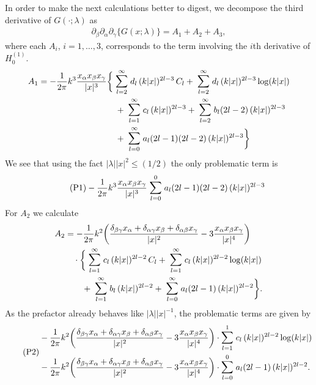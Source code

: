 In order to make the next calculations better to digest, we decompose the third derivative of $G(\cdot; \lambda)$ as 
\begin{align*}
  \partial_\beta \partial_\alpha \partial_\gamma \big\{G(x; \lambda)\big\}
  = A_1 + A_2 + A_3,
\end{align*}
where each $A_i$, $i = 1,\dots,3$, corresponds to the term involving the $i$th derivative of $H_0^{(1)}$.
\begin{align*}
  A_1 = - \frac{1}{2 \pi } k^3 \frac{x_\alpha x_\beta x_\gamma}{|x|^3} 
  &\bigg\{
     \; \mathlarger{\sum}_{l = 2}^\infty \; d_l \, (k|x|)^{2l - 3} \, C_l + \; \mathlarger{\sum}_{l = 2}^\infty \; d_l \, (k|x|)^{2l - 3} \log(k|x|)  \\
  &\quad  + \; \mathlarger{\sum}_{l = 1}^\infty \; c_l \, (k|x|)^{2l - 3} + \; \mathlarger{\sum}_{l = 2}^\infty \; b_l (2l - 2) \, (k|x|)^{2l - 3} \\
  &\quad + \; \mathlarger{\sum}_{l = 0}^\infty \; a_l (2l - 1) (2l - 2) \, (k|x|)^{2l - 3} 
  \bigg\}
\end{align*}
We see that using the fact $|\lambda| |x|^2 \leq (1/2)$ the only problematic term is
\begin{align}
  \label{eq:P1}
  \tag{P1}- \frac{1}{2 \pi } k^3 \frac{x_\alpha x_\beta x_\gamma}{|x|^3}  \; \mathlarger{\sum}_{l = 0}^{0} \; a_l (2l - 1) (2l - 2) \, (k|x|)^{2l - 3} 
\end{align}
For $A_2$ we calculate
\begin{align*}
  A_2 &= - \frac{1}{2\pi} k^2 \bigg(\frac{\delta_{\beta\gamma} x_\alpha + \delta_{\alpha \gamma} x_\beta + \delta_{\alpha \beta} x_\gamma}{|x|^2} - 3 \frac{x_\alpha x_\beta x_\gamma}{|x|^4} \bigg) \\ 
  &\quad \cdot 
  \bigg\{
    \; \mathlarger{\sum}_{l = 1}^\infty \; c_l \, (k|x|)^{2l - 2} \, C_l 
  + \; \mathlarger{\sum}_{l = 1}^\infty \; c_l \, (k|x|)^{2l - 2} \log(k|x|) \\
  &\qquad+ \; \mathlarger{\sum}_{l = 1}^\infty \; b_l \, (k|x|)^{2l - 2} 
  + \; \mathlarger{\sum}_{l = 0}^\infty \; a_l (2l - 1) \, (k|x|)^{2l - 2} 
  \bigg\}.
\end{align*}
As the prefactor already behaves like $|\lambda| |x|^{-1}$, the problematic terms are given by
\begin{align}
  \label{eq:P2}
  \tag{P2}
  \begin{alignedat}{1}
  & - \frac{1}{2\pi} k^2 \bigg(\frac{\delta_{\beta\gamma} x_\alpha + \delta_{\alpha \gamma} x_\beta + \delta_{\alpha \beta} x_\gamma}{|x|^2} - 3 \frac{x_\alpha x_\beta x_\gamma}{|x|^4} \bigg) 
   \cdot \mathlarger{\sum}_{l = 1}^1 \; c_l \, (k|x|)^{2l - 2} \log(k|x|) \\
   &- \frac{1}{2\pi} k^2 \bigg(\frac{\delta_{\beta\gamma} x_\alpha + \delta_{\alpha \gamma} x_\beta + \delta_{\alpha \beta} x_\gamma}{|x|^2} - 3 \frac{x_\alpha x_\beta x_\gamma}{|x|^4} \bigg) 
  \cdot \mathlarger{\sum}_{l = 0}^0 \; a_l (2l - 1) \, (k|x|)^{2l - 2} .
  \end{alignedat}
\end{align}
